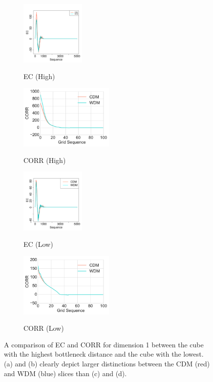 \documentclass[12pt]{article}
\begin{document}
\begin{figure}[htp!]
  \centering
    \begin{subfigure}{0.21\textwidth}
    \centering
        \caption{EC (High)}
\includegraphics[height = 1.25in]{figure_13_max_margin_2euler.pdf}
    \label{fig:valid1}
  \end{subfigure}
    \begin{subfigure}{0.24\textwidth}
    \centering
        \caption{CORR (High)}
\includegraphics[height = 1.25in]{figure_13_max_margin_corr.pdf}
    \label{fig:valid2}
  \end{subfigure}
    \begin{subfigure}{0.21\textwidth}
    \centering
        \caption{EC (Low)}
\includegraphics[height = 1.25in]{figure_13_min_margin_2euler.pdf}
    \label{fig:valid3}
  \end{subfigure}
    \begin{subfigure}{0.24\textwidth}
    \centering
        \caption{CORR (Low)}
\includegraphics[height = 1.25in]{figure_13_min_margin_corr.pdf}
    \label{fig:valid4}
  \end{subfigure}
    \caption{A comparison of EC and CORR for dimension 1 between the cube with the highest bottleneck distance and the cube with the lowest. (a) and (b) clearly depict larger distinctions between the CDM (red) and WDM (blue) slices than (c) and (d).}
    \label{fig:validationfigs}
\end{figure}
\end{document}
